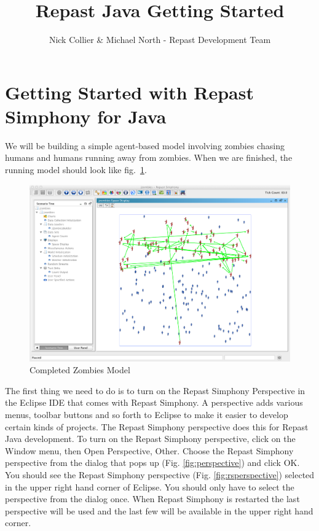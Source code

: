 \documentclass[11pt]{amsart}
\title{Repast Java Getting Started}
\author{Nick Collier \& Michael North - Repast Development Team}
\begin{document}
 
\maketitle
\setcounter{section}{-1}



\section{Getting Started with Repast Simphony for Java}
We will be building a simple agent-based model involving  zombies chasing humans and humans running away from zombies. When we are finished, the running model should look like fig.~\ref{fig:final}.

\begin{figure}[h]
\begin{center}
\vspace{.2in}
\centerline {
\includegraphics[width=5in]{GettingStartedImages/final.png}
}
\caption{Completed Zombies Model}
\label{fig:final}
\end{center}
\end{figure}
The first thing we need to do is to turn on the Repast Simphony Perspective in the Eclipse IDE that comes with Repast Simphony. A perspective adds various menus, toolbar buttons and so forth to Eclipse to make it easier to develop certain kinds of projects. The Repast Simphony perspective does this for Repast Java development. To turn on the Repast Simphony perspective, click on the Window menu, then Open Perspective, Other. Choose the Repast Simphony perspective from the dialog that pops up (Fig. \ref{fig:perspective}) and click OK. You should see the Repast Simphony perspective (Fig. \ref{fig:rsperspective}) selected in the upper right hand corner of Eclipse. You should only have to select the perspective from the dialog once. When Repast Simphony is restarted the last perspective will be used and the last few will be available in the upper right hand corner. 
\end{document}
